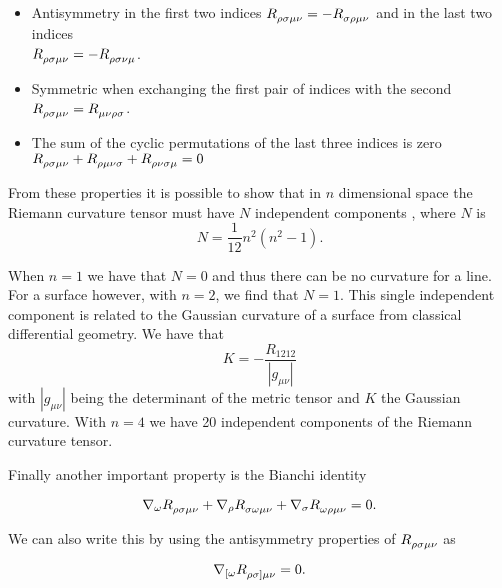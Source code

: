 \begin{itemize}
	\item Antisymmetry in the first two indices \(R\indices{_\rho_\sigma_\mu_\nu} = -R\indices{_\sigma_\rho_\mu_\nu}\) and in the last two indices \\ \(R\indices{_\rho_\sigma_\mu_\nu} = -R\indices{_\rho_\sigma_\nu_\mu}\).
	\item Symmetric when exchanging the first pair of indices with the second \(R\indices{_\rho_\sigma_\mu_\nu} = R\indices{_\mu_\nu_\rho_\sigma}\).
	\item The sum of the cyclic permutations of the last three indices is zero \(R\indices{_\rho_\sigma_\mu_\nu} + R\indices{_\rho_\mu_\nu_\sigma} + R\indices{_\rho_\nu_\sigma_\mu} = 0\)
\end{itemize}

From these properties it is possible to show that in \(n\) dimensional space the Riemann curvature tensor must have \(N\) independent components \cite{cheng}, where \(N\) is
\begin{equation}
	N = \frac{1}{12} n^2 (n^2 -1) .
\end{equation}

\begin{remark}
When \(n=1\) we have that \(N = 0\) and thus there can be no curvature for a line. For a surface however, with \(n=2\), we find that \(N=1\). This single independent component is related to the Gaussian curvature {\normalfont \cite{cheng, landau}} of a surface from classical differential geometry. We have that
\begin{equation}
	K = - \frac{R_{1212}}{|g_{\mu \nu}|}
\end{equation}
with \(|g_{\mu \nu}|\) being the determinant of the metric tensor and \(K\) the Gaussian curvature. With \(n=4\) we have 20 independent components of the Riemann curvature tensor.
\end{remark}

Finally another important property is the Bianchi identity

\begin{equation} \label{bianchi}
	\nabla_{\omega} R\indices{_\rho_\sigma_\mu_\nu} + \nabla_{\rho} R\indices{_\sigma_\omega_\mu_\nu} + \nabla_{\sigma} R\indices{_\omega_\rho_\mu_\nu} = 0 .
\end{equation}

We can also write this by using the antisymmetry properties of \(R\indices{_\rho_\sigma_\mu_\nu}\) as

\begin{equation} \label{bianchi2}
	\nabla_{[\omega} R\indices{_\rho_{\sigma ]}_\mu_\nu} = 0 .
\end{equation}

